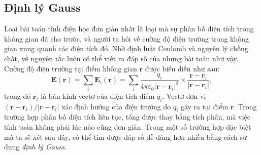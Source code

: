 \subsection{Định lý Gauss}

Loại bài toán tĩnh điện học đơn giản nhất là loại mà sự phân bố điện tích trong không gian đã cho trước, và người ta hỏi về cường độ điện trường trong không gian xung quanh các điện tích đó. Nhờ định luật Coulomb và nguyên lý chồng chất, về nguyên tắc luôn có thể viết ra đáp số của những bài toán như vậy. Cường độ điện trường tại điểm không gian $\mathbf{r}$ được biểu diễn như sau:
\[
\mathbf{E}(\mathbf{r}) = \sum_i \mathbf{E}_i(\mathbf{r}) = \sum_i \frac{q_i}{4\pi\varepsilon_0 |\mathbf{r}-\mathbf{r}_i|^2}\times\frac{\mathbf{r}-\mathbf{r}_i}{|\mathbf{r}-\mathbf{r}_i|}, \tag{3}
\]
trong đó $\mathbf{r}_i$ là bán kính vectơ của điện tích điểm $q_i$. Vectơ đơn vị $(\mathbf{r}-\mathbf{r}_i)/|\mathbf{r}-\mathbf{r}_i|$ xác định hướng của điện trường do $q_i$ gây ra tại điểm $\mathbf{r}$. Trong trường hợp phân bố điện tích liên tục, tổng được thay bằng tích phân, mà việc tính toán không phải lúc nào cũng đơn giản. Trong một số trường hợp đặc biệt mà ta sẽ xét sau đây, có thể tìm được đáp số dễ dàng hơn nhiều bằng cách sử dụng \emph{định lý Gauss}.

